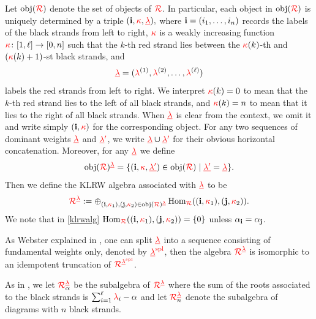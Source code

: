 Let $\obj{\klrw}$ denote the set of objects of $\klrw$.  
In particular, each object in $\obj{\klrw}$ is uniquely determined by a triple
\(
(\bi,\redkappa,\lamseq),
\)
where $\bi=(i_1,\dots,i_n)$ records the labels of the black strands from left to right, $\redkappa$ is a weakly increasing function
\(
\redkappa \colon [1,\ell] \to [0,n]
\)
such that the $k$-th red strand lies between the $\redkappa(k)$-th and $(\redkappa(k)+1)$-st black strands, and
\[
\lamseq = (\rlam^{(1)}, \rlam^{(2)}, \ldots, \rlam^{(\ell)})
\]
labels the red strands from left to right.  
We interpret $\redkappa(k)=0$ to mean that the $k$-th red strand lies to the left of all black strands, and $\redkappa(k)=n$ to mean that it lies to the right of all black strands.  
When $\lamseq$ is clear from the context, we omit it and write simply $(\bi,\redkappa)$ for the corresponding object. For any two sequences of dominant weights $\lamseq$ and $\lamseq\red{'}$, we write $\lamseq \cup \lamseq\red{'}$ for their obvious horizontal concatenation. Moreover, for any $\lamseq$ we define 
\begin{gather}
\label{objklrwalg}
\obj{\klrw}^{\lamseq}=\{ (\bi,\redkappa,\red{\underline{\lambda'}})\in \obj{\klrw}\mid \red{\underline{\lambda'}}=\lamseq \}.
\end{gather}
Then we define the KLRW algebra associated with $\lamseq$ to be 
\begin{equation}
    \label{klrwalg}
    \klrw^{\lamseq}:=\oplus_{(\bi,\redkappa_1),(\bj,\redkappa_2)\in \obj{\klrw}^{\lamseq}}\Hom_{\klrw}((\bi,\redkappa_1),(\bj,\redkappa_2)).
\end{equation}
We note that in \cref{klrwalg} $\Hom_{\klrw}((\bi,\redkappa_1),(\bj,\redkappa_2))=\{0\}$ unless $\alpha_\bi=\alpha_\bj$.

\begin{remark}
    As Webster explained in \cite[Prop. 4.21]{Web17a}, one can split $\lamseq$ into a sequence consisting of fundamental weights only, denoted by $\lamseq^{\red{\operatorname{spl}}}$, then the algebra $\klrw^{\lamseq}$ is isomorphic to an idempotent truncation of $\klrw^{\lamseq^{\red{\operatorname{spl}}}}$.
\end{remark}

As in \cite[Def. 4,7]{Web17a}, we let $\klrw_{\alpha}^\lamseq$ be the subalgebra of $\klrw^{\lamseq}$ where the sum of the roots associated to the black strands is $\sum_{i=1}^\ell\rlam_i-\alpha$ and let $\klrw_{n}^\lamseq$ denote the subalgebra of diagrams with $n$ black strands.

